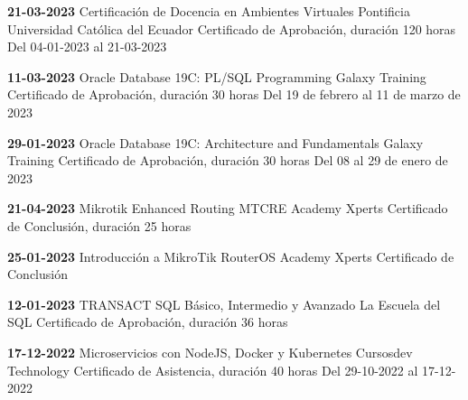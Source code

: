 \begin{devent}
    \cvevent
	{\textbf{21-03-2023}}
	{Certificación de Docencia en Ambientes Virtuales}
	{Pontificia Universidad Católica del Ecuador}
	{Certificado de Aprobación, duración 120 horas}
	{Del 04-01-2023 al 21-03-2023}
\end{devent}

\begin{levent}
    \cvevent
	{\textbf{11-03-2023}}
	{Oracle Database 19C: PL/SQL Programming}
	{Galaxy Training}
	{Certificado de Aprobación, duración 30 horas}
	{Del 19 de febrero al 11 de marzo de 2023}
\end{levent}


\begin{devent}
    \cvevent
	{\textbf{29-01-2023}}
	{Oracle Database 19C: Architecture and Fundamentals}
	{Galaxy Training}
	{Certificado de Aprobación, duración 30 horas}
	{Del 08 al 29 de enero de 2023}
\end{devent}

\begin{devent}
    \cvevent
	{\textbf{21-04-2023}}
	{Mikrotik Enhanced Routing MTCRE}
	{Academy Xperts}
	{Certificado de Conclusión, duración 25 horas}
	{}
\end{devent}

\begin{levent}
    \cvevent
	{\textbf{25-01-2023}}
	{Introducción a MikroTik RouterOS}
	{Academy Xperts}
	{Certificado de Conclusión}
	{}
\end{levent}

\begin{devent}
    \cvevent
	{\textbf{12-01-2023}}
	{TRANSACT SQL Básico, Intermedio y Avanzado}
	{La Escuela del SQL}
	{Certificado de Aprobación, duración 36 horas}
	{}
\end{devent}


\begin{levent}
    \cvevent
	{\textbf{17-12-2022}}
	{Microservicios con NodeJS, Docker y Kubernetes}
	{Cursosdev Technology}
	{Certificado de Asistencia, duración 40 horas}
	{Del 29-10-2022 al 17-12-2022}
\end{levent}

